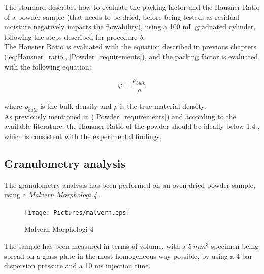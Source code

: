 \documentclass{article}
\begin{document}
        The standard describes how to evaluate the packing factor and the Hausner Ratio of a powder sample (that needs to be 
        dried, before being tested, as residual moisture negatively impacts the flowability), 
        using a 100 mL graduated cylinder, following the steps described for procedure \textit{b}. \\

        The Hausner Ratio is evaluated with the equation described in previous chapters (\ref{eq:Hausner_ratio}, \ref{Powder_requirements}), 
        and the packing factor is evaluated with the following equation: 

            \begin{equation}
                \varphi  = \frac{\rho_{bulk}}{\rho}
                \label{eq:packing_factor}
            \end{equation}

        where $\rho_{bulk}$ is the bulk density and $\rho$ is the true material density. \\

        As previously mentioned in (\ref{Powder_requirements}) and according to the available literature, the Hausner Ratio of the powder should 
        be ideally below 1.4 \autocites{doi:10.1063/1.4918516}, which is consistent with the experimental findings. \\  

        \clearpage

        \subsection{Granulometry analysis\label{granulometry_analysis}}

        The granulometry analysis has been performed on an oven dried powder sample, 
        using a \textit{Malvern Morphologi 4} \autocites{Malvern_Morphologi4}. \\ 

        \begin{figure}[h!]
            \centering
            \texttt{[image: Pictures/malvern.eps]}
            \caption{Malvern Morphologi 4 \autocites{Malvern_Morphologi4}}
            \label{fig:morphologi4}
        \end{figure}

        The sample has been measured in terms of volume, with a $5 \ mm^3$ specimen being spread on a glass plate in the 
        most homogeneous way possible, by using a 4 bar dispersion pressure and a 10 ms injection time. \\ 
\end{document}
